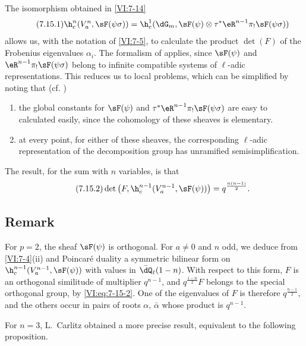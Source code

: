 The isomorphism obtained in \ref{VI:7-14} 
\begin{equation*}\tag{7.15.1}\label{VI:eq:7-15-1}
  \h_c^n(V_a^n,\sF(\psi\sigma)) = \h_c^1(\dG_m,\sF(\psi)\otimes \tau^\ast \eR^{n-1} \pi_! \sF(\psi\sigma)) 
\end{equation*}
allows us, with the notation of \ref{VI:7-5}, to calculate the product $\det(F)$ 
of the Frobenius eigenvalues $\alpha_i$. The formalism of \cite{de73} 
applies, since $\sF(\psi)$ and $\eR^{n-1} \pi_! \sF(\psi\sigma)$ 
belong to infinite compatible systems of $\ell$-adic 
representations. This reduces us to local problems, which can be 
simplified by noting that (cf. \cite[9.5]{de73}) 
\begin{enumerate}[\indent a)]
  \item the global constants for 
    $\sF(\psi)$ and $\tau^\ast \eR^{n-1} \pi_! \sF(\psi\sigma)$ are easy to 
    calculated easily, since the cohomology of these sheaves is elementary. 
  \item at every point, for either of these sheaves, the 
    corresponding $\ell$-adic representation of the decomposition group 
    has unramified semisimplification. 
\end{enumerate}

The result, for the sum with $n$ variables, is that 
\begin{equation*}\tag{7.15.2}\label{VI:eq:7-15-2}
  \det\left(F,\h_c^{n-1}(V_a^{n-1},\sF(\psi))\right) = q^{\frac{n(n-1)}{2}} \text{.} 
\end{equation*}





\subsection{Remark}\label{VI:7-16}

For $p=2$, the sheaf $\sF(\psi)$ is orthogonal. For $a\ne 0$ and $n$ 
odd, we deduce from \ref{VI:7-4}(ii) and Poincaré duality a 
symmetric bilinear form on $\h_c^{n-1}(V_a^{n-1},\sF(\psi))$ with 
values in $\bar\dQ_\ell(1-n)$. With respect to this form, $F$ is an 
orthogonal similitude of multiplier $q^{n-1}$, and $q^{\frac{1-n}{2}} F$ 
belongs to the special orthogonal group, by \eqref{VI:eq:7-15-2}. One 
of the eigenvalues of $F$ is therefore $q^{\frac{n-1}{2}}$, and the others 
occur in pairs of roots $\alpha$, $\bar\alpha$ whose product is $q^{n-1}$. 

For $n=3$, L.\ Carlitz \cite{ca69-2} obtained a more precise result, 
equivalent to the following proposition. 





